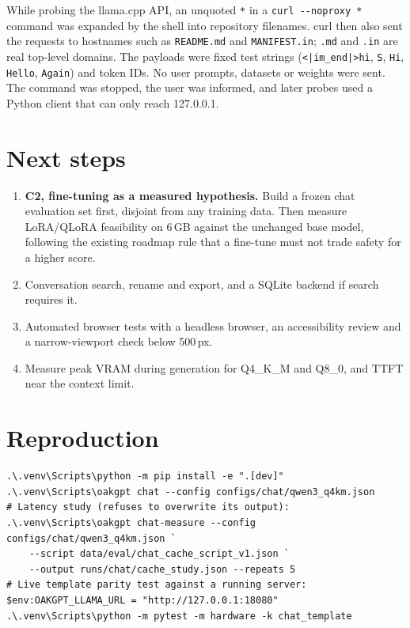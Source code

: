 \documentclass[11pt,a4paper]{article}
\newcommand{\code}[1]{\texttt{#1}}
\begin{document}
While probing the llama.cpp API, an unquoted \verb+*+ in a \verb+curl --noproxy *+
command was expanded by the shell into repository filenames. curl then also sent the
requests to hostnames such as \code{README.md} and \code{MANIFEST.in}; \code{.md} and
\code{.in} are real top-level domains. The payloads were fixed test strings
(\verb+<|im_end|>hi+, \code{S}, \code{Hi}, \code{Hello}, \code{Again}) and token IDs. No
user prompts, datasets or weights were sent. The command was stopped, the user was
informed, and later probes used a Python client that can only reach 127.0.0.1.

\section{Next steps}\label{sec:next}

\begin{enumerate}
  \item \textbf{C2, fine-tuning as a measured hypothesis.} Build a frozen chat evaluation
        set first, disjoint from any training data. Then measure LoRA/QLoRA feasibility on
        6\,GB against the unchanged base model, following the existing roadmap rule that a
        fine-tune must not trade safety for a higher score.
  \item Conversation search, rename and export, and a SQLite backend if search requires
        it.
  \item Automated browser tests with a headless browser, an accessibility review and a
        narrow-viewport check below 500\,px.
  \item Measure peak VRAM during generation for Q4\_K\_M and Q8\_0, and TTFT near the
        context limit.
\end{enumerate}

\section{Reproduction}

\begin{Verbatim}[fontsize=\footnotesize,frame=single,framesep=3mm]
.\.venv\Scripts\python -m pip install -e ".[dev]"
.\.venv\Scripts\oakgpt chat --config configs/chat/qwen3_q4km.json
# Latency study (refuses to overwrite its output):
.\.venv\Scripts\oakgpt chat-measure --config configs/chat/qwen3_q4km.json `
    --script data/eval/chat_cache_script_v1.json `
    --output runs/chat/cache_study.json --repeats 5
# Live template parity test against a running server:
$env:OAKGPT_LLAMA_URL = "http://127.0.0.1:18080"
.\.venv\Scripts\python -m pytest -m hardware -k chat_template
\end{Verbatim}
\end{document}
